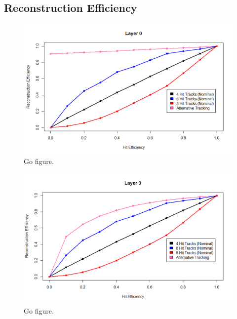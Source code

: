 \subsection{Reconstruction Efficiency}
\begin{figure}
    \centering
    \includegraphics[scale=0.5]{fig/tracking/test_eff.png}
    \caption{Go figure.}
    \label{fig:eff5}
\end{figure}
\begin{figure}
    \centering
    \includegraphics[scale=0.5]{fig/tracking/test_eff3.png}
    \caption{Go figure.}
    \label{fig:eff3}
\end{figure}

